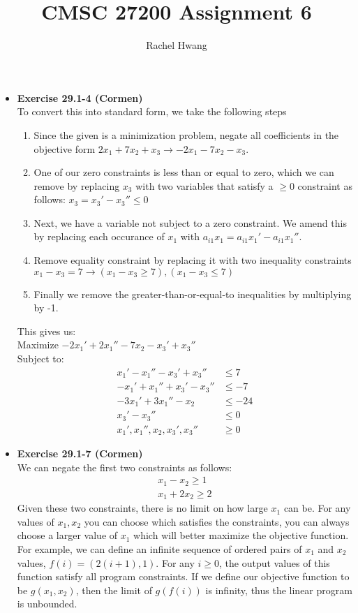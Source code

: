 \documentclass[a4paper]{article}
\title{CMSC 27200 Assignment 6}
\author{Rachel Hwang}
\begin{document}
\maketitle

\begin{itemize}

\item{\textbf{Exercise 29.1-4 (Cormen)}} \\
To convert this into standard form, we take the following steps
\begin{enumerate}
\item Since the given is a minimization problem, negate all coefficients in the objective form $2x_1 + 7x_2 + x_3 \rightarrow -2x_1 - 7x_2 - x_3$.
\item One of our zero constraints is less than or equal to zero, which we can remove by replacing $x_3$ with two variables that satisfy a $\geq 0$ constraint as follows: $x_3 = x_3' - x_3'' \leq 0$
\item Next, we have a variable not subject to a zero constraint. We amend this by replacing each occurance of $x_1$ with $a_{i1}x_1 = a_{i1}x_1' - a_{i1}x_1''$.
\item Remove equality constraint by replacing it with two inequality constraints $x_1 - x_3 = 7 \rightarrow (x_1 - x_3 \geq 7), (x_1 - x_3 \leq 7)$
\item Finally we remove the greater-than-or-equal-to inequalities by multiplying by -1.
\end{enumerate}
This gives us:\\
Maximize $-2x_1' + 2x_1'' - 7x_2 - x_3' + x_3''$ \\
Subject to:
\begin{align*}
x_1' - x_1'' - x_3' + x_3'' &\leq 7 \\
-x_1' + x_1'' + x_3' - x_3'' &\leq -7 \\
-3x_1' + 3x_1'' - x_2 &\leq -24 \\
x_3' - x_3'' &\leq 0 \\
x_1',x_1'', x_2, x_3',x_3'' &\geq 0
\end{align*}


\item{\textbf{Exercise 29.1-7 (Cormen)}} \\
We can negate the first two constraints as follows:
\begin{align*}
x_1 - x_2 \geq 1 \\
x_1 + 2x_2 \geq 2
\end{align*}
Given these two constraints, there is no limit on how large $x_1$ can be. For any values of $x_1, x_2$ you can choose which satisfies the constraints, you can always choose a larger value of $x_1$ which will better maximize the objective function. For example, we can define an infinite sequence of ordered pairs of $x_1$ and $x_2$ values, $f(i) = (2(i+1), 1)$. For any $i \geq 0$, the output values of this function satisfy all program constraints. If we define our objective function to be $g(x_1,x_2)$, then the limit of $g(f(i))$ is infinity, thus the linear program is unbounded.
\\


\end{itemize}
\end{document}
